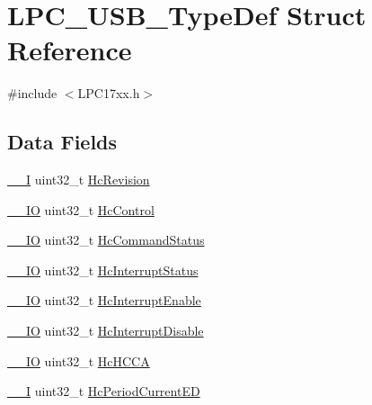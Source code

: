 \hypertarget{structLPC__USB__TypeDef}{}\section{L\+P\+C\+\_\+\+U\+S\+B\+\_\+\+Type\+Def Struct Reference}
\label{structLPC__USB__TypeDef}


{\ttfamily \#include $<$L\+P\+C17xx.\+h$>$}

\subsection*{Data Fields}
\begin{DoxyCompactItemize}
\item 
\hyperlink{LPC17xx_8h_af63697ed9952cc71e1225efe205f6cd3}{\+\_\+\+\_\+I} uint32\+\_\+t \hyperlink{structLPC__USB__TypeDef_ab4cb8ca993360c98c526a6ce0993447b}{Hc\+Revision}
\item 
\hyperlink{LPC17xx_8h_aec43007d9998a0a0e01faede4133d6be}{\+\_\+\+\_\+\+IO} uint32\+\_\+t \hyperlink{structLPC__USB__TypeDef_aee9520d95e11e8e4a78088f520f5c422}{Hc\+Control}
\item 
\hyperlink{LPC17xx_8h_aec43007d9998a0a0e01faede4133d6be}{\+\_\+\+\_\+\+IO} uint32\+\_\+t \hyperlink{structLPC__USB__TypeDef_ae2f31d6f5db9c3b8d61528cc2cecdacd}{Hc\+Command\+Status}
\item 
\hyperlink{LPC17xx_8h_aec43007d9998a0a0e01faede4133d6be}{\+\_\+\+\_\+\+IO} uint32\+\_\+t \hyperlink{structLPC__USB__TypeDef_ac30d5237ce970b8b5bc180d513f2e418}{Hc\+Interrupt\+Status}
\item 
\hyperlink{LPC17xx_8h_aec43007d9998a0a0e01faede4133d6be}{\+\_\+\+\_\+\+IO} uint32\+\_\+t \hyperlink{structLPC__USB__TypeDef_a1f5a30ab60ce6b78e18b0b65533b505c}{Hc\+Interrupt\+Enable}
\item 
\hyperlink{LPC17xx_8h_aec43007d9998a0a0e01faede4133d6be}{\+\_\+\+\_\+\+IO} uint32\+\_\+t \hyperlink{structLPC__USB__TypeDef_a043afee55e0d1e97e3ba4f5e0a54955e}{Hc\+Interrupt\+Disable}
\item 
\hyperlink{LPC17xx_8h_aec43007d9998a0a0e01faede4133d6be}{\+\_\+\+\_\+\+IO} uint32\+\_\+t \hyperlink{structLPC__USB__TypeDef_a8874334d1d615b125621ea5364e4045b}{Hc\+H\+C\+CA}
\item 
\hyperlink{LPC17xx_8h_af63697ed9952cc71e1225efe205f6cd3}{\+\_\+\+\_\+I} uint32\+\_\+t \hyperlink{structLPC__USB__TypeDef_abab93a6db5786bbba84b9e08c36ac172}{Hc\+Period\+Current\+ED}
\item 

\end{DoxyCompactItemize}
